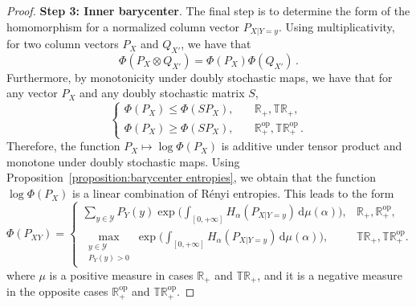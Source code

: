 \documentclass[aps,pra,11pt,onecolumn,nofootinbib,tightenlines]{revtex4-2}
\theoremstyle{definition}
\begin{document}
\begin{proof}
\noindent \textbf{Step 3: Inner barycenter}. The final step is to determine the form of the homomorphism for a normalized column vector $P_{X|Y=y}$. Using multiplicativity, for two column vectors $P_X$ and $Q_{X'}$, we have that
\begin{equation}
    \Phi(P_X \otimes Q_{X'}) = \Phi(P_X) \Phi(Q_{X'}) \,.
\end{equation}
Furthermore, by monotonicity under doubly stochastic maps, we have that for any vector $P_X$ and any doubly stochastic matrix $S$,
\begin{equation}
\begin{cases}
 \Phi(P_X)\leq \Phi(SP_X), & \quad \mathbb{R}_+,\mathbb{TR}_+, \\
\Phi(P_X) \geq \Phi(SP_X), & \quad \mathbb{R}_+^{\mathrm{op}},\mathbb{TR}_+^{\mathrm{op}}\,.
\end{cases}
\end{equation}
Therefore, the function $P_X\mapsto\log{\Phi(P_X)}$ is additive under tensor product and monotone under doubly stochastic maps. Using Proposition~\ref{proposition:barycenter entropies}, we obtain that the function $\log{\Phi(P_X)}$ is a linear combination of Rényi entropies. This leads to the form
\begin{equation}
\label{eq:FinalForm proof}
\Phi(P_{XY}) =
\begin{cases} 
\displaystyle \sum_{y \in \mathcal{Y}} P_Y(y) \exp\Bigg(\int_{[0,+\infty]} H_\alpha(P_{X|Y=y}) \, \mathrm{d}\mu(\alpha) \Bigg), & \mathbb{R}_+,\mathbb{R}_+^{\mathrm{op}}, \\
\displaystyle \max \limits_{\substack{y \in \mathcal{Y} \\ P_Y( y) > 0}} \exp\Bigg(\int_{[0,+\infty]} H_\alpha(P_{X|Y=y}) \, \mathrm{d}\mu(\alpha) \Bigg), & \mathbb{TR}_+,\mathbb{TR}_+^{\mathrm{op}}.
\end{cases}
\end{equation}
where $\mu$ is a positive measure in cases $\mathbb{R}_+$ and $\mathbb{TR}_+$, and it is a negative measure in the opposite cases $\mathbb{R}^{\mathrm{op}}_+$ and $\mathbb{TR}^{\mathrm{op}}_+$. 

\bigskip
\bigskip


\end{proof}
\end{document}
